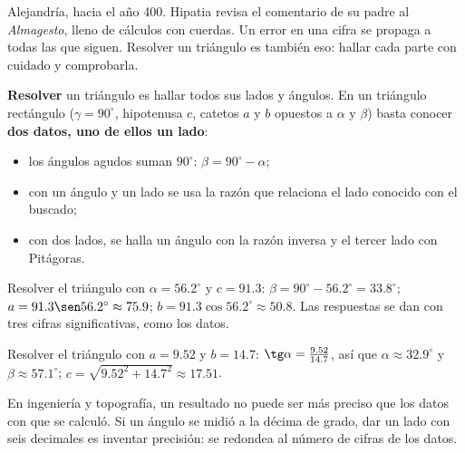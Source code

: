 \documentclass[11pt]{article}
\begin{document}
\label{tema:resolucion}

\begin{hilo}
Alejandría, hacia el año 400. Hipatia revisa el comentario de su padre al
\emph{Almagesto}, lleno de cálculos con cuerdas. Un error en una cifra se
propaga a todas las que siguen. Resolver un triángulo es también eso: hallar
cada parte con cuidado y comprobarla.
\end{hilo}

\textbf{Resolver} un triángulo es hallar todos sus lados y ángulos. En un
triángulo rectángulo ($\gamma = 90^\circ$, hipotenusa $c$, catetos $a$ y $b$
opuestos a $\alpha$ y $\beta$) basta conocer \textbf{dos datos, uno de ellos un
lado}:
\begin{itemize}
  \item los ángulos agudos suman $90^\circ$: $\beta = 90^\circ - \alpha$;
  \item con un ángulo y un lado se usa la razón que relaciona el lado conocido con el buscado;
  \item con dos lados, se halla un ángulo con la razón inversa y el tercer lado con Pitágoras.
\end{itemize}

\begin{ejemplo}
Resolver el triángulo con $\alpha = \num{56,2}^\circ$ y $c = \num{91,3}$:
$\beta = 90^\circ - \num{56,2}^\circ = \num{33,8}^\circ$;
$a = \num{91,3}\sen \num{56,2}^\circ \approx \num{75,9}$;
$b = \num{91,3}\cos \num{56,2}^\circ \approx \num{50,8}$.
Las respuestas se dan con tres cifras significativas, como los datos.
\end{ejemplo}

\begin{ejemplo}
Resolver el triángulo con $a = \num{9,52}$ y $b = \num{14,7}$:
$\tg\alpha = \frac{\num{9,52}}{\num{14,7}}$, así que $\alpha \approx \num{32,9}^\circ$
y $\beta \approx \num{57,1}^\circ$; $c = \sqrt{\num{9,52}^2 + \num{14,7}^2} \approx \num{17,51}$.
\end{ejemplo}

\begin{aplicacion}
En ingeniería y topografía, un resultado no puede ser más preciso que los datos
con que se calculó. Si un ángulo se midió a la décima de grado, dar un lado con
seis decimales es inventar precisión: se redondea al número de cifras de los
datos.
\end{aplicacion}
\end{document}
